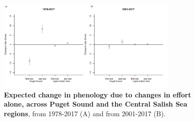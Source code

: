 \documentclass{article}
\begin{document}
\begin{figure}[!hp]
\includegraphics[width=0.8\textwidth]{../analyses/orcaphen/figures/simeffortonly2panels.png} 
\caption{\textbf{Expected change in phenology due to changes in effort alone, across Puget Sound and the Central Salish Sea regions}, from 1978-2017 (A) and from 2001-2017 (B). }
\label{fig:simeffort}
\end{figure}

\pagebreak


  
\end{document}
